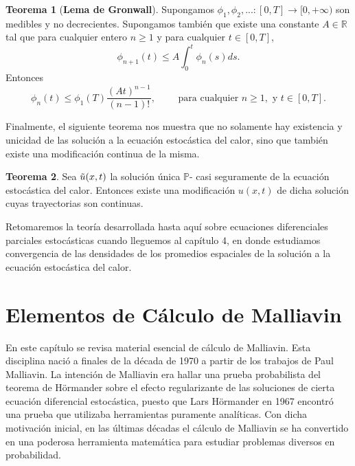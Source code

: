 \documentclass[letterpaper,twoside,12pt]{book}
\newcommand{\R}{\mathbb{R}}
\renewcommand{\P}{\mathbb{P}}
\newcommand{\1}{\mathds{1}}
\renewcommand{\to}{\rightarrow}
\theoremstyle{definition}
\theoremstyle{definition}
\newtheorem{teo}{Teorema}
\theoremstyle{definition}
\theoremstyle{definition}
\theoremstyle{definition}
\theoremstyle{definition}
\theoremstyle{definition}
\begin{document}
\begin{teo}[\textbf{Lema de Gronwall}] 
 Supongamos $\phi_1,\phi_2,...:[0,T]\to[0,+\infty)$ son medibles y no decrecientes. Supongamos también que existe una constante $A\in \R$ tal que para cualquier entero $n\geq1$ y para cualquier $t\in[0,T]$,
 \[
 \phi_{n+1}(t)\leq A\int_{0}^{t}\phi_n(s)ds.   
 \]
 Entonces 
 \[
 \phi_n(t)\leq \phi_1(T)\frac{(At)^{n-1}}{(n-1)!}, \qquad \text{ para cualquier }n\geq1, \text{ y } t\in[0,T].   
 \]
 \end{teo}
Finalmente, el siguiente teorema nos muestra que no solamente hay existencia y unicidad de las solución a la ecuación estocástica del calor, sino que también existe una modificación continua de la misma.

\begin{teo} 
 Sea $\Tilde{u}(x,t)$ la solución única $\P$- casi seguramente de la ecuación estocástica del calor. Entonces existe una modificación $u(x,t)$ de dicha solución cuyas trayectorias son continuas.
 \end{teo}

Retomaremos la teoría desarrollada hasta aquí sobre ecuaciones diferenciales parciales estocásticas cuando lleguemos al capítulo 4, en donde estudiamos convergencia de las densidades de los promedios espaciales de la solución a la ecuación estocástica del calor. 



\chapter{Elementos de Cálculo de Malliavin}%
En este capítulo se revisa material esencial de cálculo de Malliavin. Esta disciplina nació a finales de la década de 1970 a partir de los trabajos de Paul Malliavin. La intención de Malliavin era hallar una prueba probabilista del teorema de Hörmander sobre el efecto regularizante de las soluciones de cierta ecuación diferencial estocástica, puesto que Lars Hörmander en 1967 encontró una prueba que utilizaba herramientas puramente analíticas. Con dicha motivación inicial, en las últimas décadas el cálculo de Malliavin se ha convertido en una poderosa herramienta matemática para estudiar problemas diversos en probabilidad. 
\end{document}
